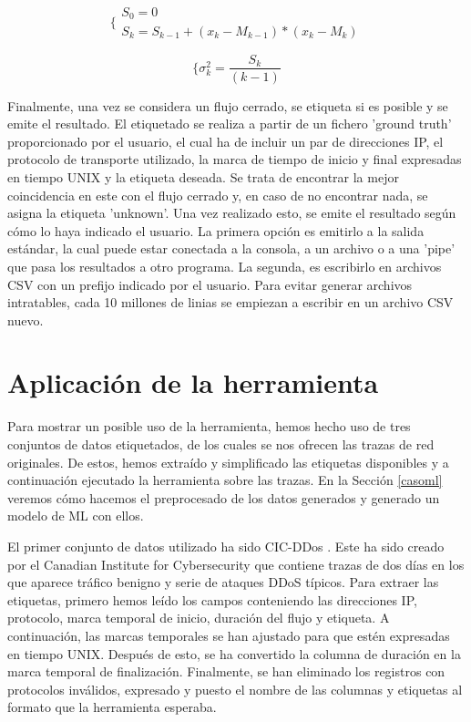 \documentclass[10pt,a4paper,twoside]{article}
\begin{document}
\begin{multicols}{2}
    \begin{equation} \label{eq:sqrrec}
    \biggl\{
        \begin{array}{l}
            S_{0} = 0 \\
            S_{k} = S_{k-1} + ( x_{k} - M_{k-1} ) * ( x_{k} - M_{k} )
        \end{array}      
    \end{equation}
    
    \begin{equation} \label{eq:variancereq}
    \biggl\{
        \sigma^2_{k} = {\frac{S_{k}}{(k - 1)}}
    \end{equation}

    Finalmente, una vez se considera un flujo cerrado, se etiqueta si es posible y se emite el resultado. El etiquetado se realiza a partir de un fichero 'ground truth' proporcionado por el usuario, el cual ha de incluir un par de direcciones IP, el protocolo de transporte utilizado, la marca de tiempo de inicio y final expresadas en tiempo UNIX y la etiqueta deseada. Se trata de encontrar la mejor coincidencia en este con el flujo cerrado y, en caso de no encontrar nada, se asigna la etiqueta 'unknown'. Una vez realizado esto, se emite el resultado según cómo lo haya indicado el usuario. La primera opción es emitirlo a la salida estándar, la cual puede estar conectada a la consola, a un archivo o a una 'pipe' que pasa los resultados a otro programa. La segunda, es escribirlo en archivos CSV con un prefijo indicado por el usuario. Para evitar generar archivos intratables, cada 10 millones de linias se empiezan a escribir en un archivo CSV nuevo.

    \section{Aplicación de la herramienta} \label{casoexec}

    Para mostrar un posible uso de la herramienta, hemos hecho uso de tres conjuntos de datos etiquetados, de los cuales se nos ofrecen las trazas de red originales. De estos, hemos extraído y simplificado las etiquetas disponibles y a continuación ejecutado la herramienta sobre las trazas. En la Sección \ref{casoml} veremos cómo hacemos el preprocesado de los datos generados y generado un modelo de ML con ellos.

    El primer conjunto de datos utilizado ha sido CIC-DDos \cite{8888419}. Este ha sido creado por el Canadian Institute for Cybersecurity que contiene trazas de dos días en los que aparece tráfico benigno y serie de ataques DDoS típicos. Para extraer las etiquetas, primero hemos leído los campos conteniendo las direcciones IP, protocolo, marca temporal de inicio, duración del flujo y etiqueta. A continuación, las marcas temporales se han ajustado para que estén expresadas en tiempo UNIX. Después de esto, se ha convertido la columna de duración en la marca temporal de finalización. Finalmente, se han eliminado los registros con protocolos inválidos, expresado y puesto el nombre de las columnas y etiquetas al formato que la herramienta esperaba.
    

\end{multicols}
\end{document}
